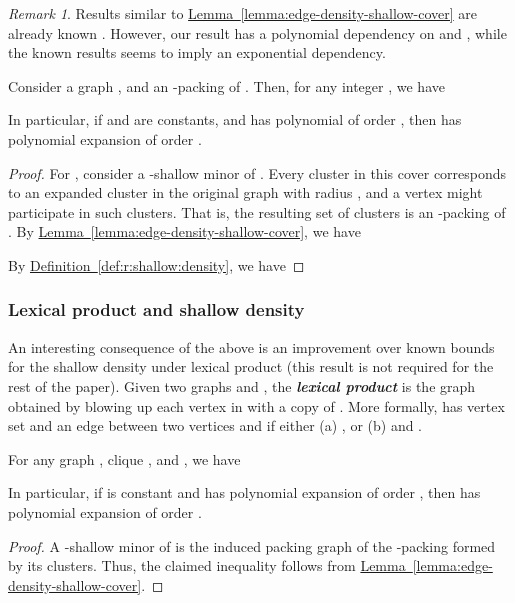 \documentclass[12pt]{article}
\newcommand{\emphic}[2]{\textcolor{blue25}{\textbf{\emph{#1}}}\index{#2}}
\renewcommand{\emphic}[2]{\textbf{\emph{#1}}}
\newcommand{\emphi}[1]{\emphic{#1}{#1}}
\theoremstyle{remark}\theoremheaderfont{\sf}\theorembodyfont{\upshape}
\newtheorem*{remark:unnumbered}[theorem]{Remark}\newtheorem{remark}[theorem]{Remark}\newtheorem{example}[theorem]{Example}
\numberwithin{figure}{section}\numberwithin{table}{section}\numberwithin{equation}{section}
\newcommand{\HLink}[2]{\hyperref[#2]{#1~\ref*{#2}}}
\newcommand{\corlab}[1]{\label{cor:#1}}
\newcommand{\defref}[1]{\HLink{Definition}{def:#1}}
\newcommand{\lemlab}[1]{\label{lemma:#1}}
\newcommand{\lemref}[1]{\HLink{Lemma}{lemma:#1}}
\begin{document}
\begin{remark:unnumbered}
  Results similar to \lemref{edge-density-shallow-cover} are already
  known \cite{no-s-12}. However, our result has a polynomial
  dependency on  and , while the known results seems to
  imply an exponential dependency.
\end{remark:unnumbered}



\begin{lemma}
  \lemlab{expansion:shallow:cover} Consider a graph , and an -packing  of
  . Then, for any integer , we have
  
  In particular, if  and  are constants, and  has
  polynomial of order , then  has polynomial expansion of
  order .
\end{lemma}

\begin{proof}
  For , consider a -shallow minor  of
  . Every cluster in this cover corresponds to an expanded
  cluster in the original graph  with radius ,
  and a vertex might participate in  such clusters. That is,
  the resulting set  of clusters is an
  -packing of .  By
  \lemref{edge-density-shallow-cover}, we have
  
  By \defref{r:shallow:density}, we have
  
\end{proof}


\subsubsection{Lexical product and shallow density}

An interesting consequence of the above is an improvement over known
bounds for the shallow density under lexical product (this result is
not required for the rest of the paper).  Given two graphs 
and , the \emphi{lexical product} 
is the graph obtained by blowing up each vertex in  with a
copy of . More formally,  has vertex
set  and an edge
between two vertices  and  if either (a)
, or (b)  and
.
\begin{corollary}
  \corlab{grad-lexical-product}For any graph , clique , and
  , we have
  
  In particular, if  is constant and  has polynomial
  expansion of order , then  has
  polynomial expansion of order .
\end{corollary}
\begin{proof}
  A -shallow minor of  is the induced
  packing graph of the -packing formed by its
  clusters. Thus, the claimed inequality follows from
  \lemref{edge-density-shallow-cover}.
\end{proof}
\end{document}

